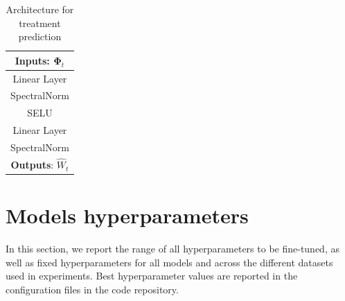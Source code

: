 \documentclass{article}
\theoremstyle{plain}
\theoremstyle{definition}
\theoremstyle{remark}
\begin{document}
\begin{table}[!htbp]
\centering
\begin{tabular}{c}
\hline \textbf{Inputs}: $\mathbf{\Phi}_t$\\
\hline Linear Layer\\
\hline SpectralNorm\\
\hline SELU\\
\hline Linear Layer  \\
\hline SpectralNorm\\
\hline \textbf{Outputs}: $\hat{W}_t$\\
\end{tabular}
\caption{Architecture for treatment prediction}
\label{tab: archi_treat_pred}
\end{table}
\section{Models hyperparameters}
\label{sect: huperparams_details}

In this section, we report the range of all hyperparameters to be fine-tuned, as well as fixed hyperparameters for all models and across the different datasets used in experiments. Best hyperparameter values are reported in the configuration files in the code repository.
\end{document}

